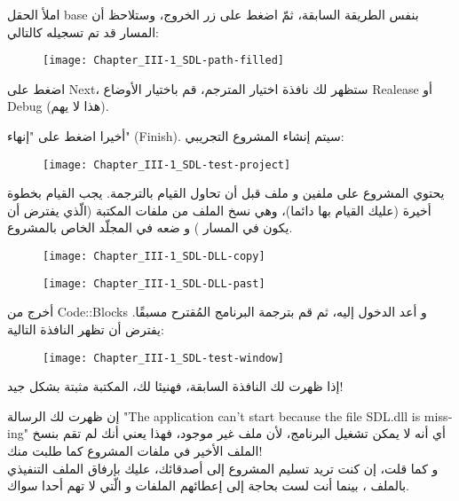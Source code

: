 املأ الحقل
\textenglish{base}
بنفس الطريقة السابقة، ثمّ اضغط على زر الخروج، وستلاحظ أن المسار قد تم تسجيله كالتالي:

\begin{figure}[H]
	\centering
	\texttt{[image: Chapter\_III-1\_SDL-path-filled]}
\end{figure}

اضغط على
\textenglish{Next}،
 ستظهر لك نافذة اختيار المترجم، قم باختيار الأوضاع
\textenglish{Realease}
أو
\textenglish{Debug}
(هذا لا يهم).

أخيرا اضغط على "إنهاء"
(\textenglish{Finish}).
 سيتم إنشاء المشروع التجريبي:
 
 \begin{figure}[H]
 	\centering
 	\texttt{[image: Chapter\_III-1\_SDL-test-project]}
 \end{figure}


يحتوي المشروع على ملفين 
و ملف
قبل أن تحاول القيام بالترجمة. يجب القيام بخطوة أخيرة (عليك القيام بها دائما)، وهي نسخ الملف 
من ملفات المكتبة (الّذي يفترض أن يكون في المسار 
)
و ضعه في المجلّد الخاص بالمشروع.

 \begin{figure}[H]
	\centering
	\texttt{[image: Chapter\_III-1\_SDL-DLL-copy]}
\end{figure}
 \begin{figure}[H]
	\centering
	\texttt{[image: Chapter\_III-1\_SDL-DLL-past]}
\end{figure}

أخرج من 
\textenglish{Code::Blocks}
و أعد الدخول إليه، ثم قم بترجمة البرنامج المُقترح مسبقًا. يفترض أن تظهر النافذة التالية:

 \begin{figure}[H]
	\centering
	\texttt{[image: Chapter\_III-1\_SDL-test-window]}
\end{figure}


إذا ظهرت لك النافذة السابقة، فهنيئا لك، المكتبة مثبتة بشكل جيد!

\begin{information}
إن ظهرت لك الرسالة 
"\textenglish{The application can't start because the file SDL.dll is missing}"
أي أنه لا يمكن تشغيل البرنامج، لأن ملف 
غير موجود، فهذا يعني أنك لم تقم بنسخ الملف الأخير في ملفات المشروع كما طلبت منك!\\
و كما قلت، إن كنت تريد تسليم المشروع إلى أصدقائك، عليك بإرفاق الملف التنفيذي 
بالملف 
،
بينما أنت لست بحاجة إلى إعطائهم الملفات 
و
الّتي لا تهم أحدا سواك.
\end{information}

